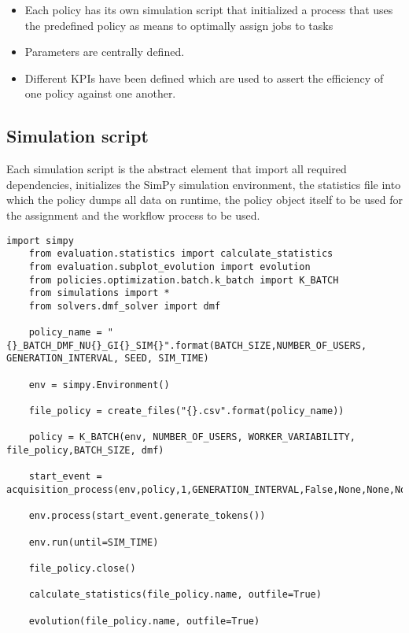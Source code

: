 \documentclass{seal_thesis}
\begin{document}
\begin{itemize}
	\item Each policy has its own simulation script that initialized a process that uses the predefined policy as means to optimally assign jobs to tasks
	\item Parameters are centrally defined.
	\item Different KPIs have been defined which are used to assert the efficiency of one policy against one another.
\end{itemize}

\subsection{Simulation script}

Each simulation script is the abstract element that import all required dependencies, initializes the SimPy simulation environment, the statistics file into which the policy dumps all data on runtime, the policy object itself to be used for the assignment and the workflow process to be used. 

\begin{lstlisting}[caption=Example of the structure of a simulation script. Here for the K-Batch policy using the DMF solver,label=lst:simulation_script,style=CustomPython]
	import simpy
	from evaluation.statistics import calculate_statistics
	from evaluation.subplot_evolution import evolution
	from policies.optimization.batch.k_batch import K_BATCH
	from simulations import *
	from solvers.dmf_solver import dmf

	policy_name = "{}_BATCH_DMF_NU{}_GI{}_SIM{}".format(BATCH_SIZE,NUMBER_OF_USERS, GENERATION_INTERVAL, SEED, SIM_TIME)

	env = simpy.Environment()

	file_policy = create_files("{}.csv".format(policy_name))

	policy = K_BATCH(env, NUMBER_OF_USERS, WORKER_VARIABILITY, file_policy,BATCH_SIZE, dmf)

	start_event = acquisition_process(env,policy,1,GENERATION_INTERVAL,False,None,None,None)

	env.process(start_event.generate_tokens())

	env.run(until=SIM_TIME)

	file_policy.close()

	calculate_statistics(file_policy.name, outfile=True)

	evolution(file_policy.name, outfile=True)
\end{lstlisting}
\end{document}
